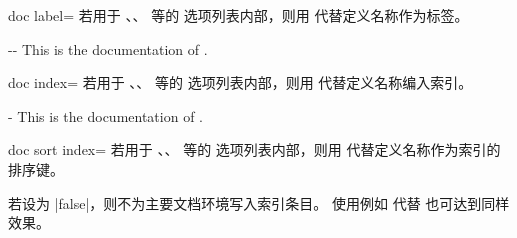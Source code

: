\clearpage

\begin{docTcbKey}[][doc new={2019-09-18}]{doc label}{=}{\tcbdocdescNoDefaultInit}
  若用于 、、 等的
  选项列表内部，则用  代替定义名称作为标签。
\begin{dispExample}
\begin{docPathOperation*}[doc label=pathline]{-{}-}{}
  This is the documentation of .
\end{docPathOperation*}
\end{dispExample}
\end{docTcbKey}

\begin{docTcbKey}[][doc new={2020-01-07}]{doc index}{=}{\tcbdocdescNoDefaultInit}
  若用于 、、 等的
  选项列表内部，则用  代替定义名称编入索引。
\begin{dispExample}
\begin{docPathOperation}[doc index=foo path (horizontal then vertical),
    doc label=pathline2]{-\textbar}{}
  This is the documentation of .
\end{docPathOperation}
\end{dispExample}
\end{docTcbKey}


\begin{docTcbKey}[][doc new={2020-04-23}]{doc sort index}{=}{\tcbdocdescNoDefaultInit}
  若用于 、、 等的
  选项列表内部，则用  代替定义名称作为索引的排序键。
\begin{dispListing}
\begin{docCommands}[
    doc name        = l_tcobox_example_tl,
    doc sort index  = example_tl,  %
  ]{}
\end{docCommands}
\end{dispListing}
\end{docTcbKey}


\begin{docTcbKeys}[
    doc name         = doc into index,
    doc key choices* = {defaultinit=true,false},
  ]{}
  若设为 |false|，则不为主要文档环境写入索引条目。
  使用例如  代替  也可达到同样效果。
\end{docTcbKeys}


